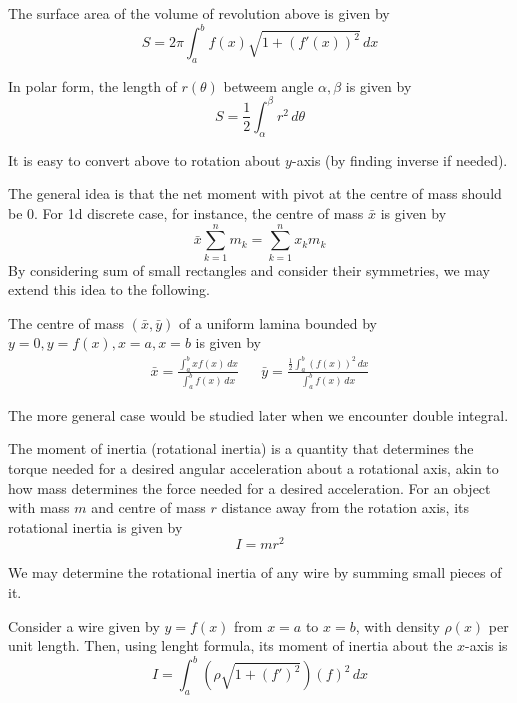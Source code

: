 \documentclass[11pt]{article}
\begin{document}
\begin{theorem}
  The surface area of the volume of revolution above is given by 
  \[S=2\pi\int_{a}^{b}f(x)\sqrt{1+(f'(x))^2}\,dx\]

  In polar form, the length of \(r(\theta)\) betweem angle \(\alpha,\beta\) is given by
  \[S=\frac{1}{2}\int_{\alpha}^{\beta}r^2\,d\theta\]
\end{theorem}
It is easy to convert above to rotation about \(y\)-axis (by finding inverse if needed).

The general idea is that the net moment with pivot at the centre of mass should be 0. For 1d discrete case, for instance, the centre of mass \(\bar{x}\) is given by 
\[\bar{x}\sum_{k=1}^n m_k=\sum_{k=1}^n x_km_k\]
By considering sum of small rectangles and consider their symmetries, we may extend this idea to the following.
\begin{theorem}
  The centre of mass \((\bar{x},\bar{y})\) of a uniform lamina bounded by \(y=0,y=f(x),x=a,x=b\) is given by
  \begin{align*}
    \bar{x}=\frac{\int_{a}^{b}xf(x)\,dx}{\int_{a}^{b}f(x)\,dx} & & \bar{y}=\frac{\frac{1}{2}\int_{a}^{b}(f(x))^2\,dx}{\int_{a}^{b}f(x)\,dx}
  \end{align*}
\end{theorem}
The more general case would be studied later when we encounter double integral.

\vspace{5pt}The moment of inertia (rotational inertia) is a quantity that determines the torque needed for a desired angular acceleration about a rotational axis, akin to how mass determines the force needed for a desired acceleration. For an object with mass \(m\) and centre of mass \(r\) distance away from the rotation axis, its rotational inertia is given by 
\[I=mr^2\]

We may determine the rotational inertia of any wire by summing small pieces of it. 
\begin{theorem}
  Consider a wire given by \(y=f(x)\) from \(x=a\) to \(x=b\), with density \(\rho(x)\) per unit length. Then, using lenght formula, its moment of inertia about the \(x\)-axis is
  \[I=\int_{a}^{b}(\rho\sqrt{1+(f')^2})(f)^2\,dx\]
\end{theorem}
\end{document}
